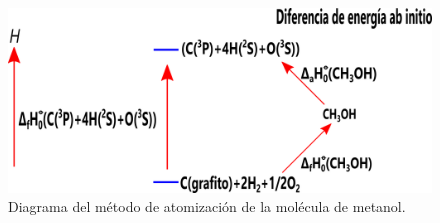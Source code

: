 \documentclass{beamer}
\begin{document}
\begin{frame}[fragile]
\begin{figure}
\includegraphics[scale=.65]{images/atomization-CH3OH}
\caption{Diagrama del método de atomización de la molécula de metanol.}
\end{figure}

\end{frame}
\end{document}
